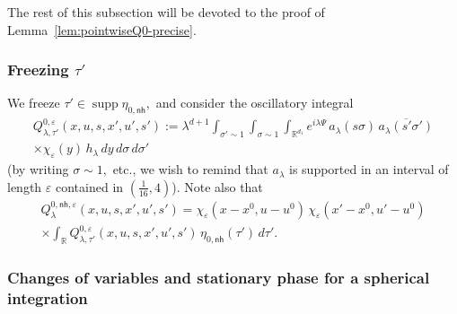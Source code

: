 \documentclass[leqno]{amsart}
\theoremstyle{definition}
\theoremstyle{remark}
\numberwithin{equation}{section}
\newcommand{\R}{\mathbb{R}}
\DeclareMathOperator*{\supp}{supp}
\newcommand\la{{\lambda}}
\newcommand\ve{{\varepsilon}}
\begin{document}
The rest of this subsection will be  devoted to the proof of Lemma~\ref{lem:pointwiseQ0-precise}.

\subsubsection{Freezing $\tau'$}
We freeze $\tau'\in \supp \eta_{0,\mathsf{nh}},$  and consider the oscillatory integral
\begin{multline}\label{eq:Q0-v-2}
Q^{0,\varepsilon}_{\lambda,\tau'}(x,u,s,x',u',s') := \lambda^{d + 1} \int_{\sigma' \sim 1} \int_{\sigma \sim 1} \int_{\R^{d_1}} e^{i\lambda\Psi} \,a_\lambda(s\sigma)  \,\overline{a_\lambda(s'\sigma')}  \\ 
\times \chi_{\varepsilon}(y) \, h_\lambda \, dy \, d\sigma \, d\sigma'
\end{multline}
(by writing $\sigma\sim 1,$ etc., we wish to remind that $a_\la$ is supported in an interval of length $\ve$ contained in 
$(\frac 1{16},4)$). Note also that 
\begin{multline*}
Q^{0,\mathsf{nh},\varepsilon}_\lambda(x,u,s,x',u',s')
 =  \chi_{\varepsilon}(x-x^0,u-u^0) \, \chi_{\varepsilon}(x'-x^0,u'-u^0)\\
 \times\int_\R Q^{0,\varepsilon}_{\lambda,\tau'}(x,u,s,x',u',s') \, \eta_{0,\mathsf{nh}}( \tau')\,  d\tau'.
\end{multline*}

\subsubsection{Changes of  variables and  stationary phase for a spherical integration}
\end{document}

